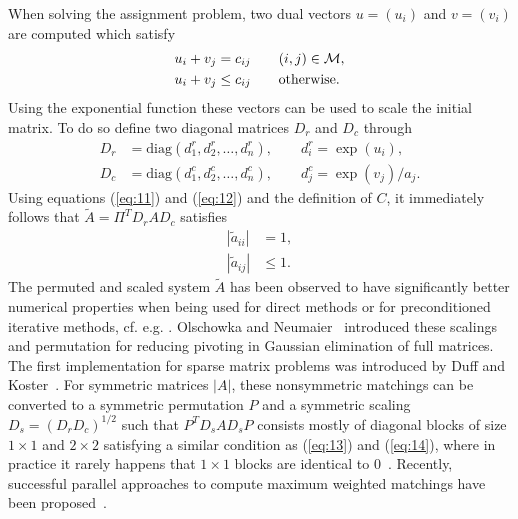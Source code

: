 When solving the assignment problem, two dual vectors $u = (u_i)$ and
$v = (v_i)$ are computed which satisfy
\begin{align}
  u_i + v_j & = c_{ij} \qquad  (i,j) \in \mathcal{M}, \label{eq:11} \\
  u_i + v_j & \leq c_{ij} \qquad \text{otherwise}. \label{eq:12}
\end{align}
Using the exponential function these vectors can be used to scale the 
initial matrix. To do so define
two diagonal matrices $D_r$ and $D_c$ through
\begin{align}
  D_r & = \text{diag}(d_1^r,d_2^r,\dots,d_n^r), \qquad d_i^r = \exp(u_i),\\ 
  D_c & = \text{diag}(d_1^c,d_2^c,\dots,d_n^c), \qquad d_j^c = \exp(v_j)/a_j.
\end{align}
Using equations (\ref{eq:11}) and (\ref{eq:12}) and the definition of $C$, 
it immediately follows that $\tilde A = \Pi^T D_r A D_c$ satisfies
\begin{align}
  |\tilde a_{ii}| & = 1, \label{eq:13}\\
  |\tilde a_{ij}| & \le 1. \label{eq:14}
\end{align}
The permuted and scaled system $\tilde A$ has been observed to
have significantly better numerical properties when being used
for direct methods or for preconditioned iterative methods, cf. e.g. 
\cite{benzi:2000:phi,DufK99S}. Olschowka and
Neumaier~\cite{olschowka:1996} introduced these scalings and
permutation for reducing pivoting in Gaussian elimination of full
matrices. The first implementation for sparse matrix problems was
introduced by Duff and Koster~\cite{DufK99S}.  For symmetric
matrices $|A|$, these nonsymmetric matchings can be converted
to a symmetric permutation $P$ and a symmetric scaling $D_s=(D_rD_c)^{1/2}$
such that $P^TD_sAD_sP$ consists mostly of diagonal blocks of size $1\times 1$
and $2\times 2$ satisfying a similar condition as (\ref{eq:13}) and (\ref{eq:14}),
where in practice it rarely happens that  $1\times 1$ blocks are identical 
to $0$~\cite{dupr:04a}.
Recently, successful parallel approaches to compute maximum weighted matchings have
been proposed~\cite{LanPM11,LanAM14}.

